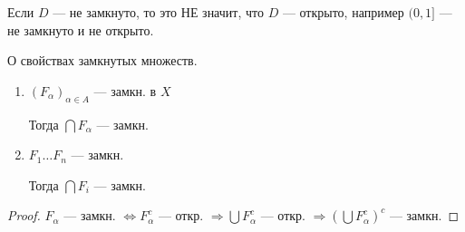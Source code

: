 \begin{remark}
    Если $D$ --- не замкнуто, то это НЕ значит, что $D$ --- открыто, например $(0,1]$ --- не замкнуто и не открыто.
\end{remark}

\begin{theorem}
    О свойствах замкнутых множеств.

    \begin{enumerate}
        \item $(F_\alpha)_{\alpha\in A}$ --- замкн. в $X$
        
        Тогда $\bigcap F_\alpha$ --- замкн.

        \item $F_1\ldots F_n$ --- замкн.
        
        Тогда $\bigcap F_i$ --- замкн.
    \end{enumerate}
\end{theorem}

\begin{proof}
    $F_\alpha$ --- замкн. $\Leftrightarrow F_\alpha^c$ --- откр. $\Rightarrow \bigcup F_\alpha^c$ --- откр. $\Rightarrow (\bigcup F_\alpha^c)^c$ --- замкн.
\end{proof}

